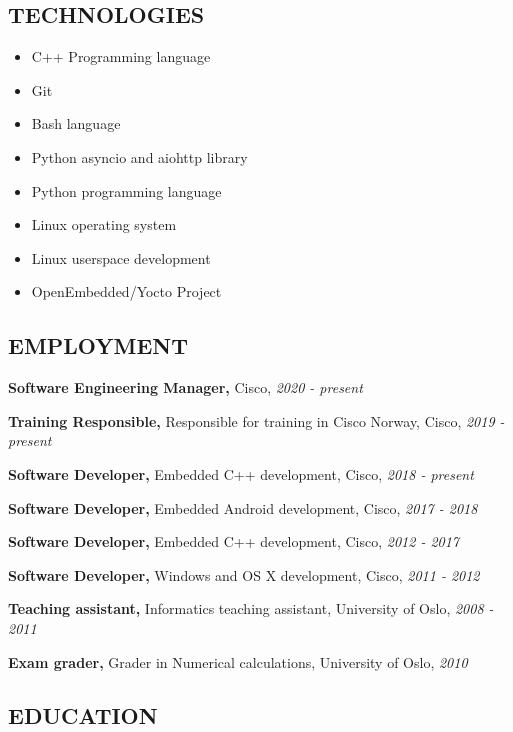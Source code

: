 \documentclass{article}
\begin{document}
\subsection*{TECHNOLOGIES}

\begin{multicols}{2}

  \begin{itemize}
    \item C++ Programming language
    \item Git
    \item Bash language
    \item Python asyncio and aiohttp library
    \item Python programming language
    \item Linux operating system
    \item Linux userspace development
    \item OpenEmbedded/Yocto Project
  \end{itemize}
\end{multicols}

\subsection*{EMPLOYMENT}

\begin{addmargin}[2em]{0em}
  {\bf Software Engineering Manager,} Cisco, {\it 2020 - present}

  {\bf Training Responsible,} Responsible for training in Cisco Norway, Cisco, {\it 2019 - present}

  {\bf Software Developer,} Embedded C++ development, Cisco, {\it 2018 - present}

  {\bf Software Developer,} Embedded Android development, Cisco, {\it 2017 - 2018}

  {\bf Software Developer,} Embedded C++ development, Cisco, {\it 2012 - 2017}

  {\bf Software Developer,} Windows and OS X development, Cisco, {\it 2011 - 2012}

  {\bf Teaching assistant,} Informatics teaching assistant, University of Oslo, {\it 2008 - 2011}

  {\bf Exam grader,} Grader in Numerical calculations, University of Oslo, {\it 2010}
\end{addmargin}

\subsection*{EDUCATION}
\end{document}

